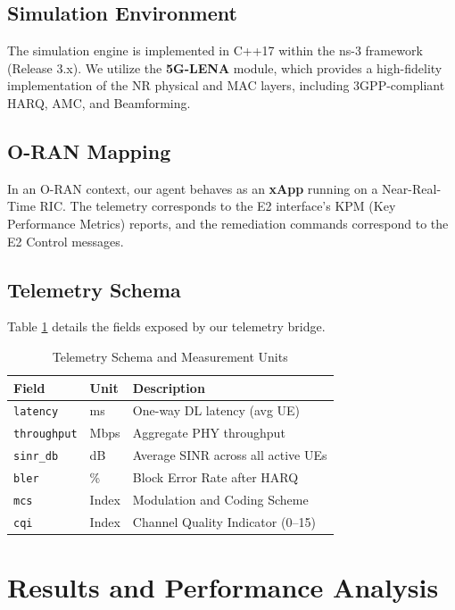 \documentclass[journal]{IEEEtran}
\begin{document}
\subsection{Simulation Environment}
The simulation engine is implemented in C++17 within the ns-3 framework (Release 3.x). We utilize the \textbf{5G-LENA} module, which provides a high-fidelity implementation of the NR physical and MAC layers, including 3GPP-compliant HARQ, AMC, and Beamforming.

\subsection{O-RAN Mapping}
In an O-RAN context, our agent behaves as an \textbf{xApp} running on a Near-Real-Time RIC. The telemetry corresponds to the E2 interface's KPM (Key Performance Metrics) reports, and the remediation commands correspond to the E2 Control messages.

\subsection{Telemetry Schema}
Table \ref{tab:telemetry} details the fields exposed by our telemetry bridge.

\begin{table}[htbp]
\centering
\caption{Telemetry Schema and Measurement Units}
\label{tab:telemetry}
\begin{tabular}{p{2cm} p{1.5cm} p{3.5cm}}
\toprule
\textbf{Field} & \textbf{Unit} & \textbf{Description} \\
\midrule
\texttt{latency} & ms & One-way DL latency (avg UE) \\
\texttt{throughput} & Mbps & Aggregate PHY throughput \\
\texttt{sinr\_db} & dB & Average SINR across all active UEs \\
\texttt{bler} & \% & Block Error Rate after HARQ \\
\texttt{mcs} & Index & Modulation and Coding Scheme \\
\texttt{cqi} & Index & Channel Quality Indicator (0--15) \\
\bottomrule
\end{tabular}
\end{table}

\section{Results and Performance Analysis}
\end{document}
